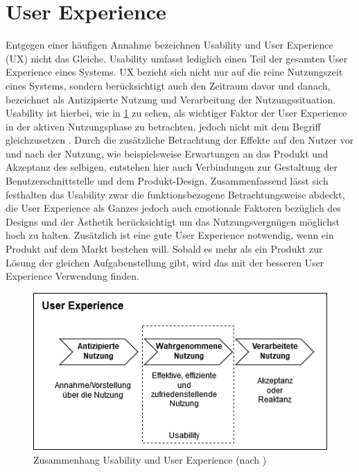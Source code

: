 \section{User Experience}
Entgegen einer häufigen Annahme bezeichnen Usability und User Experience (UX) nicht das Gleiche.
Usability umfasst lediglich einen Teil der gesamten User Experience eines Systems\cite{Knight.2019c}.
UX bezieht sich nicht nur auf die reine Nutzungszeit eines Systems, sondern berücksichtigt auch den Zeitraum davor und danach, bezeichnet als Antizipierte Nutzung und Verarbeitung der Nutzungssituation.
Usability ist hierbei, wie in \cref{fig:UX} zu sehen, als wichtiger Faktor der User Experience in der aktiven Nutzungsphase zu betrachten, jedoch nicht mit dem Begriff gleichzusetzen \cite{Sarodnick.2016}.
Durch die zusätzliche Betrachtung der Effekte auf den Nutzer vor und nach der Nutzung, wie beispielsweise Erwartungen an das Produkt und Akzeptanz des selbigen, entstehen hier auch Verbindungen zur Gestaltung der Benutzerschnittstelle und dem Produkt-Design\cite{Richter.2016}.
Zusammenfassend lässt sich festhalten das Usability zwar die funktionsbezogene Betrachtungsweise abdeckt, die User Experience als Ganzes jedoch auch emotionale Faktoren bezüglich des Designs und der Ästhetik berücksichtigt um das Nutzungsvergnügen möglichst hoch zu halten.
Zusätzlich ist eine gute User Experience notwendig, wenn ein Produkt auf dem Markt bestehen will.
Sobald es mehr als ein Produkt zur Lösung der gleichen Aufgabenstellung gibt, wird das mit der besseren User Experience Verwendung finden\cite{Knight.2019c}.


\begin{figure}[H]
\begin{center}
  \includegraphics[scale=0.6]{figures/UX.png}
  \caption{Zusammenhang Usability und User Experience (nach \cite{Sarodnick.2016})}
  \label{fig:UX}
\end{center}
\end{figure}

